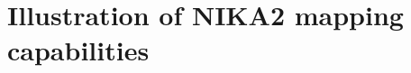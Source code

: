 \documentclass[]{aa} %
\begin{document}


\section{Illustration of NIKA2 mapping capabilities}
\label{Illustration of NIKA2 mapping capabilities}
\end{document}
